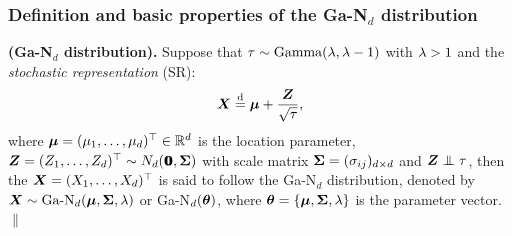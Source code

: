 \subsubsection{Definition and basic properties of the Ga-N$_d$ distribution}        %

\begin{definition}{\rm \textbf{(Ga-N$_d$ distribution).} Suppose that $\tau \sim \mbox{Gamma}(\lambda, \lambda - 1)$ with $\lambda > 1$ and the \textit{stochastic representation} (SR):
$$
    {\boldsymbol{X}} \stackrel{{\rm d}}{=} {\boldsymbol{\mu}} + \frac{{\boldsymbol{Z}}}{\sqrt{\tau}}, 
$$
where ${\boldsymbol{\mu}} = (\mu_1, \dots, \mu_d)^\top \in {\mathbb{R}}^d$ is the location parameter, ${\boldsymbol{Z}} = (Z_1, \dots, Z_d)^\top \sim N_d({\bf 0}\!\!\!{\bf 0}, {\mbox{\boldmath$\Sigma$}})$ with scale matrix ${\mbox{\boldmath$\Sigma$}} = (\sigma_{ij})_{d\times d}$ and $\ibZ \inde \tau$, then the \trv ${\boldsymbol{X}} = (X_1, \dots, X_d)^\top$ is said to follow the Ga-N$_d$ distribution, denoted by ${\boldsymbol{X}} \sim \mbox{Ga-N}_d({\boldsymbol{\mu}}, {\mbox{\boldmath$\Sigma$}}, \lambda)$ or Ga-N$_d({\boldsymbol{\theta}})$, where ${\boldsymbol{\theta}} = \{{\boldsymbol{\mu}}, {\mbox{\boldmath$\Sigma$}}, \lambda\}$ is the parameter vector. \hfill $\|$
}\end{definition}

